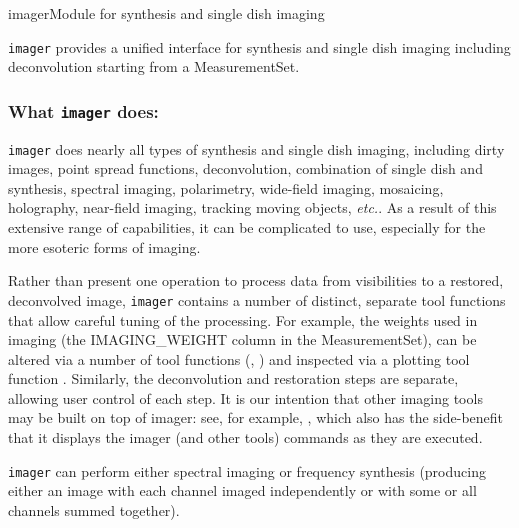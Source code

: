 \begin{ahmodule}{imager}{Module for synthesis and single dish imaging}

\begin{ahdescription} 
\end{ahdescription}

{\tt imager} provides a unified interface for synthesis and single
dish imaging including deconvolution starting from a MeasurementSet.

\subsubsection*{What \texttt{imager} does:}

\begin{description}
\protect\item[Standard synthesis and single dish imaging] {\tt imager} does
nearly all types of synthesis and single dish imaging, including dirty
images, point spread functions, deconvolution, combination of single
dish and synthesis, spectral imaging, polarimetry, wide-field imaging,
mosaicing, holography, near-field imaging, tracking moving objects,
{\em etc.}. As a result of this extensive range of capabilities, it
can be complicated to use, especially for the more esoteric forms of
imaging.
\protect\item[Fine scaled tools] Rather than present one operation
to process data from visibilities to a restored, deconvolved
image, {\tt imager} contains a number of distinct, separate tool functions
that allow careful tuning of the processing. For example, the
weights used in imaging (the IMAGING\_WEIGHT column in the
MeasurementSet), can be altered via a number of tool functions
(\protect{}, \protect{}) 
and inspected via a plotting
tool function \protect{}. Similarly, the
deconvolution and restoration steps are separate, allowing user
control of each step. It is our intention that other imaging tools may
be built on top of imager: see, for example,
\protect{}, which also has the side-benefit
that
it displays the imager (and other tools) commands as they are
executed.
\protect\item[Spectral imaging] \texttt{imager} can perform either spectral
imaging or frequency synthesis (producing either an image with 
each channel imaged independently or with some or 
all channels summed together).

\end{description}
\end{ahmodule}
